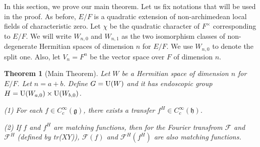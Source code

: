 \documentclass[11pt, oneside,reqno]{amsart}   	%
\newtheorem{theorem}{Theorem}[section]
\begin{document}
In this section, we prove our main theorem. Let us fix notations that will be used in the proof. As before, $E/F$ is a quadratic extension of non-archimedean local fields of characteristic zero. Let $\chi$ be the quadratic character of $F^\times$ corresponding to $E/F$. We will write $W_{n,0}$ and $W_{n,1}$ as the two isomorphism classes of non-degenerate Hermitian spaces of dimension $n$ for $E/F$. We use $W_{n,0}$ to denote the split one. Also, let $V_n=F^n$ be the vector space over $F$ of dimension $n$.

\begin{theorem}[Main Theorem] \label{Main Theorem}
Let $W$ be a Hermitian space of dimension $n$ for $E/F$. Let $n=a+b$. Define $G=\textup{U}(W)$ and it has endoscopic group $H=\textup{U}(W_{a,0})\times \textup{U}(W_{b,0})$. 

\textup{(1)} For each $f \in C_c^\infty(\mathfrak{g})$, there exists a transfer $f^H \in C_c^\infty(\mathfrak{h})$.

\textup{(2)} If $f$ and $f^H$ are matching functions, then for the Fourier transfrom $\mathcal{F}$ and $\mathcal{F}^H$ \textup{(}defined by \textup{tr(}$XY$\textup{))}, $\mathcal{F}(f)$ and $\mathcal{F}^H(f^H)$ are also matching functions.

\end{theorem}
\end{document}
